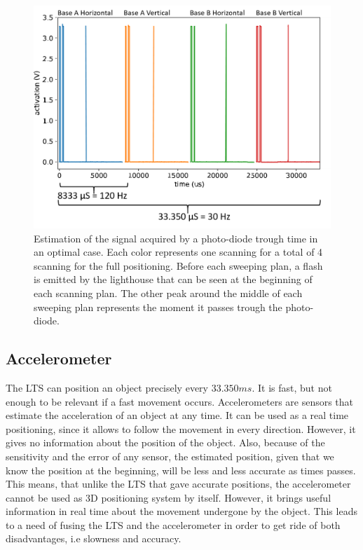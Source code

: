 \documentclass{vldb}
\begin{document}
\begin{figure}[h!]
  \includegraphics[scale = 0.28]{Image/signal.png}
  \caption{Estimation of the signal acquired by a photo-diode trough time in an optimal case. Each color represents one scanning for a total of 4 scanning for the full positioning. Before each sweeping plan, a flash is emitted by the lighthouse that can be seen at the beginning of each scanning plan. The other peak around the middle of each sweeping plan represents the moment it passes trough the photo-diode.}
  \label{im:signal}
\end{figure}

\subsection{Accelerometer} \label{Accel}

The LTS can position an object precisely every $33.350 ms$. It is fast, but not enough to be relevant if a fast movement occurs. Accelerometers are sensors that estimate the acceleration of an object at any time. It can be used as a real time positioning, since it allows to follow the movement in every direction. However, it gives no information about the position of the object. Also, because of the sensitivity and the error of any sensor, the estimated position, given that we know the position at the beginning, will be less and less accurate as times passes. This means, that unlike the LTS that gave accurate positions, the accelerometer cannot be used as 3D positioning system by itself. However, it brings useful information in real time about the movement undergone by the object. \newline
This leads to a need of fusing the LTS and the accelerometer in order to get ride of both disadvantages, i.e slowness and accuracy.
\end{document}
